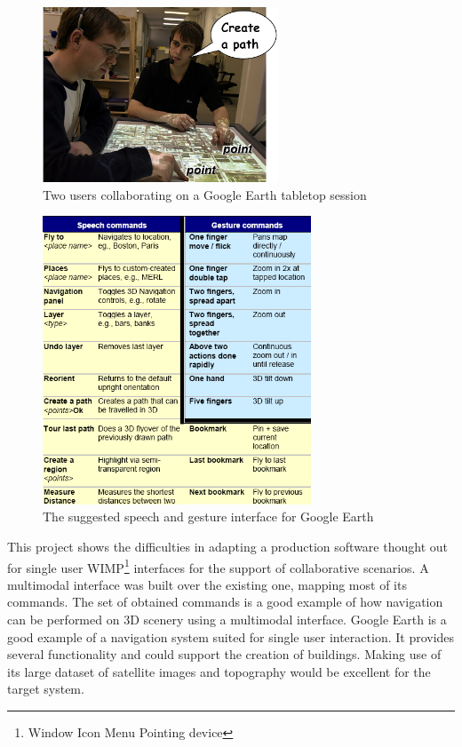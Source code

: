 \begin{figure}[!ht]
    \centering
    \includegraphics[width=7cm]{gfx/sp-gest-ttop.png}
    \caption{Two users collaborating on a Google Earth tabletop session}
    \label{FIG-SP-TABLETOP}
\end{figure}

\begin{figure}[!ht]
    \centering
    \includegraphics[width=8cm]{gfx/sp-gest-ttop2.png}
    \caption{The suggested speech and gesture interface for Google Earth}
    \label{FIG-SP-TABLETOP2}
\end{figure}


This project shows the difficulties in adapting a production software thought out
for single user WIMP\footnote{Window Icon Menu Pointing device} interfaces for the support of collaborative scenarios.
A multimodal interface was built over the existing one, mapping most of its commands.
The set of obtained commands is a good example of how navigation can be performed on
3D scenery using a multimodal interface.
Google Earth is a good example of a navigation system suited for single user interaction.
It provides several functionality and could support the creation of buildings.
Making use of its large dataset of satellite images and topography would be excellent
for the target system.


